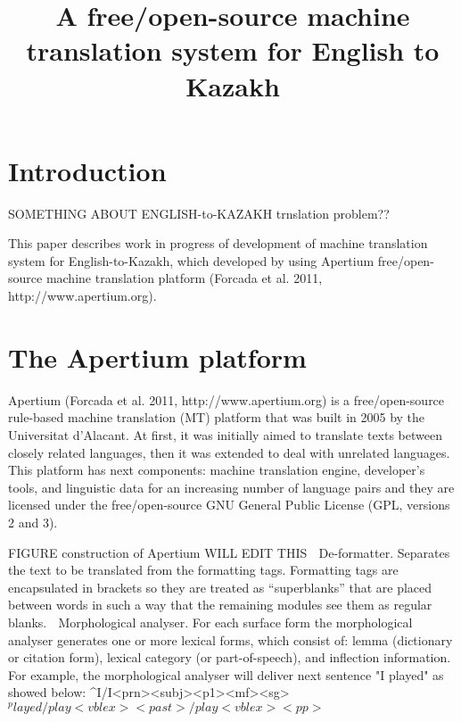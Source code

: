 \documentclass[a4paper,twocolumn,11pt]{article}
\title{A free/open-source machine translation system for English to Kazakh}
\begin{document}
\section{Introduction}

SOMETHING ABOUT ENGLISH-to-KAZAKH trnslation problem??

This paper describes work in progress of development of machine translation system for English-to-Kazakh, which developed by using Apertium free/open-source machine translation platform (Forcada et al. 2011, http://www.apertium.org). 

\section{The Apertium platform}
Apertium (Forcada et al. 2011, http://www.apertium.org) is a free/open-source rule-based machine translation (MT) platform that was built in 2005 by the Universitat d’Alacant. At first, it was initially aimed to translate texts between closely related languages, then it was extended to deal with unrelated languages. This platform has next components: machine translation engine, developer’s tools, and linguistic data for an increasing number of language pairs and they are licensed under the free/open-source GNU General Public License (GPL, versions 2 and 3).

FIGURE construction of Apertium
WILL EDIT THIS
	De-formatter. Separates the text to be translated from the formatting tags.  Formatting tags are encapsulated in brackets so they are treated as “superblanks” that are placed between words in such a way that the remaining modules see them as regular blanks.  
	Morphological analyser. For each surface form the morphological analyser generates one or more lexical forms, which consist of: lemma (dictionary or citation form), lexical category (or part-of-speech), and inflection information. 
For example, the morphological analyser will deliver next sentence "I played" as showed below:
^I/I<prn><subj><p1><mf><sg>$ 
^played/play<vblex><past>/play<vblex><pp>$
\end{document}
